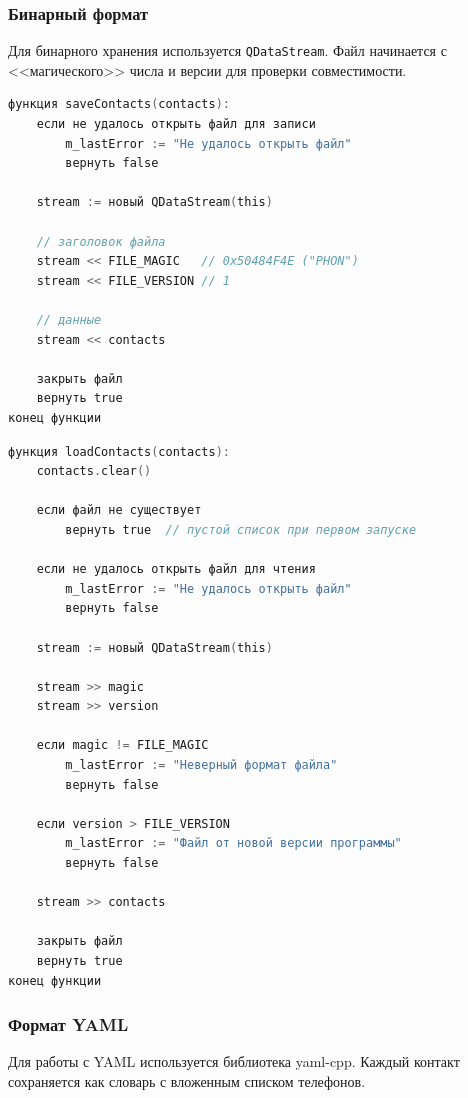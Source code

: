 \subsubsection*{Бинарный формат}

Для бинарного хранения используется \texttt{QDataStream}. Файл начинается с <<магического>> числа и версии для проверки совместимости.

\begin{lstlisting}[language=C, caption=Функция saveContacts]
функция saveContacts(contacts):
    если не удалось открыть файл для записи
        m_lastError := "Не удалось открыть файл"
        вернуть false
    
    stream := новый QDataStream(this)
    
    // заголовок файла
    stream << FILE_MAGIC   // 0x50484F4E ("PHON")
    stream << FILE_VERSION // 1
    
    // данные
    stream << contacts
    
    закрыть файл
    вернуть true
конец функции
\end{lstlisting}

\begin{lstlisting}[language=C, caption=Функция loadContacts]
функция loadContacts(contacts):
    contacts.clear()
    
    если файл не существует
        вернуть true  // пустой список при первом запуске
    
    если не удалось открыть файл для чтения
        m_lastError := "Не удалось открыть файл"
        вернуть false
    
    stream := новый QDataStream(this)
    
    stream >> magic
    stream >> version
    
    если magic != FILE_MAGIC
        m_lastError := "Неверный формат файла"
        вернуть false
    
    если version > FILE_VERSION
        m_lastError := "Файл от новой версии программы"
        вернуть false
    
    stream >> contacts
    
    закрыть файл
    вернуть true
конец функции
\end{lstlisting}

\subsubsection*{Формат YAML}

Для работы с YAML используется библиотека yaml-cpp. Каждый контакт сохраняется как словарь с вложенным списком телефонов.

